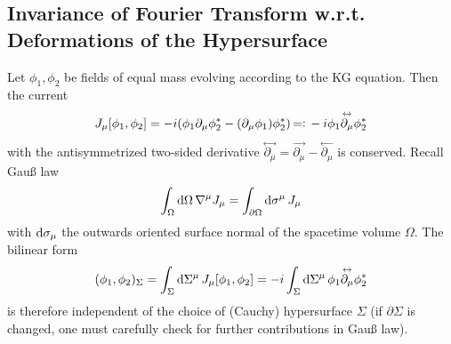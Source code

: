 
\subsection{Invariance of Fourier Transform w.r.t. Deformations of the Hypersurface}
\label{subsec:FourierDeformHypersurface}

Let $\phi_1,\phi_2$ be fields of equal mass evolving according to the KG equation. Then the current
\begin{equation}
    J_\mu[\phi_1,\phi_2]=-{i}(\phi_1\partial_\mu\phi_2^*-(\partial_\mu\phi_1)\phi_2^*){\,=\vcentcolon\,}-{i}\phi_1\overset{\leftrightarrow}{\partial_\mu}\phi_2^*
\end{equation}
with the antisymmetrized two-sided derivative $\overset{\leftrightarrow}{\partial_\mu}=\overset{\rightarrow}{\partial_\mu}-\overset{\leftarrow}{\partial_\mu}$ is conserved. Recall Gauß law
\begin{equation}
    \int_\Omega\text{d} \Omega\,\nabla^\mu J_\mu=\int_{\partial\Omega}\text{d}\sigma^\mu\,J_\mu
\end{equation}
with $\text{d}\sigma_\mu$ the outwards oriented surface normal of the spacetime volume $\Omega$. The bilinear form
\begin{equation}
    (\phi_1,\phi_2)_\Sigma=\int_\Sigma\text{d}\Sigma^\mu\,J_\mu[\phi_1,\phi_2]=-{i}\int_\Sigma\text{d}\Sigma^\mu\,\phi_1\overset{\leftrightarrow}{\partial_\mu}\phi_2^*
\end{equation}
is therefore independent of the choice of (Cauchy) hypersurface $\Sigma$ (if $\partial\Sigma$ is changed, one must carefully check for further contributions in Gauß law).

